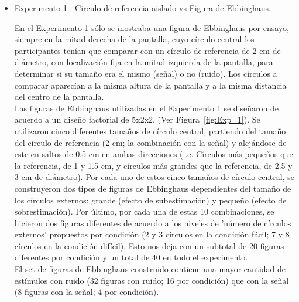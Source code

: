 \begin{itemize}
\item Experimento 1 : Circulo de referencia aislado vs Figura de Ebbinghaus.

En el Experimento 1 sólo se mostraba una figura de Ebbinghaus por ensayo, siempre en la mitad derecha de la pantalla, cuyo círculo central los participantes tenían que comparar con un círculo de referencia de 2 cm de diámetro, con localización fija en la mitad izquierda de la pantalla, para determinar si su tamaño era el mismo (señal) o no (ruido). Los círculos a comparar aparecían a la misma altura de la pantalla y a la misma distancia del centro de la pantalla.\\

Las figuras de Ebbinghaus utilizadas en el Experimento 1 se diseñaron de acuerdo a un diseño factorial de 5x2x2, (Ver Figura~\ref{fig:Exp_1}). Se utilizaron cinco diferentes tamaños de círculo central, partiendo del tamaño del círculo de referencia (2 cm; la combinación con la señal) y alejándose de este en saltos de 0.5 cm en ambas direcciones (i.e. Círculos más pequeños que la referencia, de 1 y 1.5 cm, y círculos más grandes que la referencia, de 2.5 y 3 cm de diámetro). Por cada uno de estos cinco tamaños de círculo central, se construyeron dos tipos de figuras de Ebbinghaus dependientes del tamaño de los círculos externos: grande (efecto de subestimación) y pequeño (efecto de sobrestimación). Por último, por cada una de estas 10 combinaciones, se hicieron dos figuras diferentes de acuerdo a los niveles de 'número de círculos externos' propuestos por condición (2 y 3 círculos en la condición fácil; 7 y 8 círculos en la condición difícil). Esto nos deja con un subtotal de 20 figuras diferentes por condición y un total de 40 en todo el experimento.\\
 
El set de figuras de Ebbinghaus construido contiene una mayor cantidad de estímulos con ruido (32 figuras con ruido; 16 por condición) que con la señal (8 figuras con la señal; 4 por condición). 


\end{itemize}

